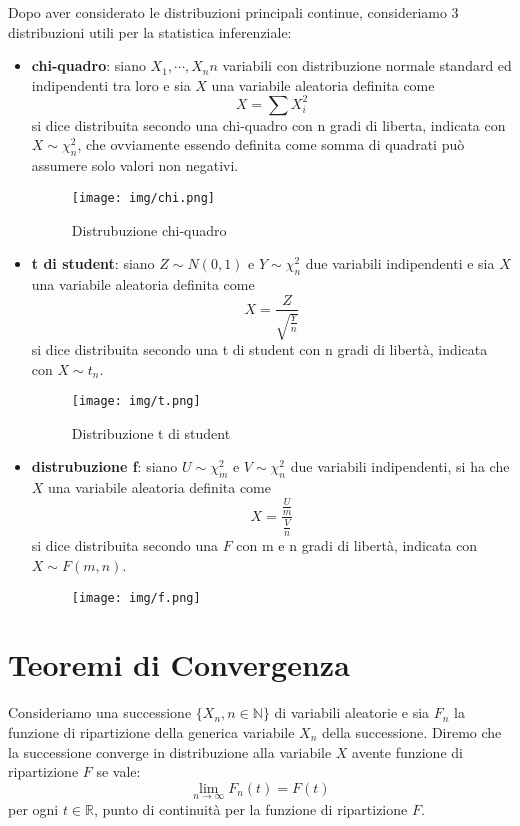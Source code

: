 \documentclass[a4paper,12pt, oneside]{book}
\newcommand{\numberset}{\mathbb}
\newcommand{\N}{\numberset{N}}
\newcommand{\R}{\numberset{R}}
\begin{document}
Dopo aver considerato le distribuzioni principali continue, consideriamo 3 distribuzioni utili per la statistica inferenziale:
\begin{itemize}
    \item \textbf{chi-quadro}: siano $X_1, \cdots, X_n n$ variabili con distribuzione normale standard ed
        indipendenti tra loro e sia $X$ una variabile aleatoria definita come 
        \[ X = \sum X_i ^ 2 \]
        si dice distribuita secondo una chi-quadro con n gradi di liberta, indicata con $X \sim \chi_n^2$,
        che ovviamente essendo definita come somma di quadrati può assumere solo valori non negativi.

        \begin{figure}
            \caption{Distrubuzione chi-quadro}
	        \texttt{[image: img/chi.png]}
        \end{figure}
    \item \textbf{t di student}: siano $Z \sim N(0, 1)$ e $Y \sim \chi_n^2$ due variabili indipendenti e
        sia $X$ una variabile aleatoria definita come 
        \[X = \frac{Z}{\sqrt{\frac{Y}{n}}}\]
        si dice distribuita secondo una t di student con n gradi di libertà, indicata con $X \sim t_n$.

        \begin{figure}
            \caption{Distribuzione t di student}
	        \texttt{[image: img/t.png]}
        \end{figure}

    \item \textbf{distrubuzione f}: siano $U \sim \chi_m^2$ e $V \sim \chi_n^2$ due variabili indipendenti, si
        ha che $X$ una variabile aleatoria definita come 
        \[X = \frac{\frac{U}{m}}{\frac{V}{n}}\]
        si dice distribuita secondo una $F$ con m e n gradi di libertà, indicata con $X \sim F(m, n)$.

        \begin{figure}
	        \texttt{[image: img/f.png]}
        \end{figure}
\end{itemize}

\chapter{Teoremi di Convergenza}
Consideriamo una successione $\{X_n, n \in \N\}$ di variabili aleatorie e sia $F_n$ la funzione di ripartizione
della generica variabile $X_n$ della successione.\newline
Diremo che la successione converge in distribuzione alla variabile $X$ avente funzione di ripartizione $F$ se vale:
\[\lim_{n\to\infty} F_n(t) = F(t)\]
per ogni $t \in \R$, punto di continuità per la funzione di ripartizione $F$. 
\end{document}
